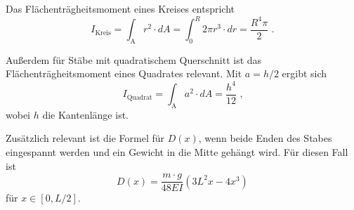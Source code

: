 Das Flächenträgheitsmoment eines Kreises entspricht
\begin{equation}\label{eq:FlTreagKreis}
        I_\text{Kreis} = \int_\text{A} r^2 \cdot dA = \int_0^R 2 \pi r^3 \cdot dr = \frac{R^4 \pi}{2}\text{ .}
\end{equation}

Außerdem für Stäbe mit quadratischem Querschnitt ist das Flächenträgheitsmoment eines Quadrates relevant.
Mit $a = h / 2$ ergibt sich
\begin{equation}\label{eq:FlTreagQuadrat}
        I_\text{Quadrat} = \int_\text{A} a^2 \cdot dA = \frac{h^4} {12} \text{ ,}
\end{equation}
wobei $h$ die Kantenlänge ist.%

Zusätzlich relevant ist die Formel für $D(x)$, wenn beide Enden des Stabes eingespannt werden und
ein Gewicht in die Mitte gehängt wird.
Für diesen Fall ist
\begin{equation} \label{eq:E2}
        D(x) = \frac{m \cdot g}{48 E I} (3L^2x - 4 x^3)
\end{equation}
für $ x \in [0,L/2]$.